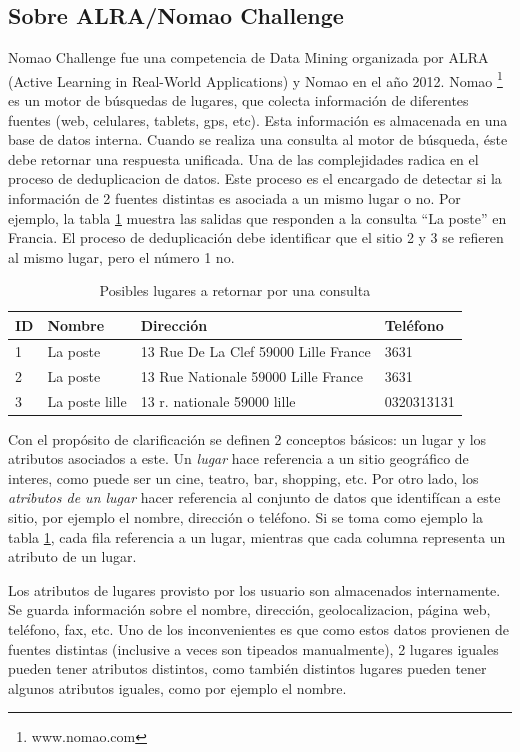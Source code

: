\documentclass[journal]{IEEEtran}
\begin{document}
\subsection{Sobre ALRA/Nomao Challenge}
Nomao Challenge fue una competencia de Data Mining organizada por ALRA 
(Active Learning in Real-World Applications) y Nomao en el año 2012. Nomao 
\footnote{www.nomao.com} es un motor de búsquedas de lugares, que colecta
información de diferentes fuentes (web, celulares, tablets, gps, 
etc). Esta información es almacenada en una base de datos interna. 
Cuando se realiza una consulta al motor de búsqueda, éste debe retornar una
respuesta unificada. Una de las complejidades
radica en el proceso de deduplicacion de datos. Este
proceso es el encargado de detectar si la información de 2 fuentes distintas
es asociada a un mismo lugar o no. Por ejemplo, la tabla \ref{table:example1}
muestra las salidas que responden a la consulta ``La poste'' en Francia. El
proceso de deduplicación debe identificar que el sitio 2 y 3 se refieren
al mismo lugar, pero el número 1 no.

\begin{table}[ht!]
\caption{Posibles lugares a retornar por una consulta}
\label{table:example1}
\centering
\begin{tabular}{l | l l l }
ID & Nombre & Dirección & Teléfono  \\
\hline
1 & La poste & 13 Rue De La Clef 59000 Lille France & 3631 \\ 
2 & La poste & 13 Rue Nationale 59000 Lille France & 3631 \\
3 & La poste lille & 13 r. nationale 59000 lille & 0320313131 \\
\end{tabular}
\end{table}

Con el propósito de clarificación se definen 2 conceptos básicos:
un lugar y los atributos asociados a este. Un \textit{lugar} hace referencia
a un sitio geográfico de interes, como puede ser un cine, teatro, bar, shopping, etc. 
Por otro lado, los \textit{atributos de un lugar} hacer referencia al conjunto de datos que 
identifícan a este sitio, por ejemplo el nombre, dirección o teléfono. 
Si se toma como ejemplo la tabla  \ref{table:example1}, 
cada fila  referencia a un lugar, 
mientras que cada columna representa un atributo de un lugar.

Los atributos de lugares  provisto por los usuario son almacenados internamente. 
Se guarda información sobre el nombre, dirección, geolocalizacion, página web,
teléfono, fax, etc. Uno de los inconvenientes es que como estos datos
provienen de fuentes distintas (inclusive a veces son tipeados manualmente),
2 lugares iguales pueden tener atributos distintos, como también
distintos lugares pueden tener algunos atributos iguales, como por 
ejemplo el nombre.
\end{document}
